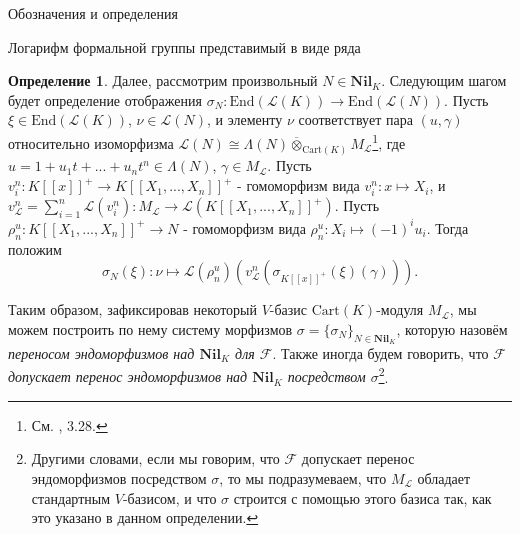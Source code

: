 \documentclass[a4paper,14pt]{extarticle}
\theoremstyle{definition}
\newtheorem{definition}{Определение}[section]
\newcommand{\Cart}{\mathrm{Cart}}
\newcommand{\End}[1]{\mathrm{End}\left(#1\right)}
\newcommand{\Nil}[1]{\mathbf{Nil}_{#1}}
\newcommand{\sF}{\mathscr{F}}
\newcommand{\sL}{\mathscr{L}}
\begin{document}
\begin{section}{Обозначения и определения}
\begin{subsection}{Логарифм формальной группы представимый в виде ряда}
\begin{definition}
    Далее, рассмотрим произвольный ${ N \in \Nil{K} }$. Следующим шагом будет определение отображения ${ \sigma_N : \End{\sL(K)} \rightarrow \End{\sL(N)} }$. Пусть ${ \xi \in \End{\sL(K)} }$, ${ \nu \in \sL(N) }$, и элементу $\nu$ соответствует пара ${ (u, \gamma) }$ относительно изоморфизма ${ \sL(N) \cong \Lambda(N) \overline{\otimes}_{\Cart(K)} M_\sL }$\footnote{
        См. \cite{Zink}, 3.28.
    }, где ${ u = 1 + u_1 t + ... + u_n t^n \in \Lambda(N) }$, ${ \gamma \in M_\sL }$. Пусть ${ v^n_i : K[[x]]^+ \rightarrow K[[X_1, ..., X_n]]^+ }$ - гомоморфизм вида ${ v^n_i : x \mapsto X_i }$, и ${ v^n_\sL = \sum\limits_{i = 1}^n \sL (v^n_i) : M_\sL \rightarrow \sL(K[[X_1, ..., X_n]]^+) }$. Пусть ${ \rho^u_n : K[[X_1, ..., X_n]]^+ \rightarrow N }$ - гомоморфизм вида ${ \rho^u_n : X_i \mapsto (-1)^i u_i }$. Тогда положим
    \begin{equation*}
        \sigma_N(\xi) :
        \nu \mapsto
        \sL(\rho^u_n) \left(
            v^n_\sL \left(
                \sigma_{K[[x]]^+}(\xi)(\gamma)
            \right)
        \right).
    \end{equation*}

    Таким образом, зафиксировав некоторый $V$-базис $\Cart(K)$-модуля $M_\sL$, мы можем построить по нему систему морфизмов ${ \sigma = \{ \sigma_N \}_{N \in \Nil{K}} }$, которую назовём \textit{переносом эндоморфизмов над $\Nil{K}$ для $\sF$}. Также иногда будем говорить, что \textit{$\sF$ допускает перенос эндоморфизмов над $\Nil{K}$ посредством $\sigma$}\footnote{
        Другими словами, если мы говорим, что $\sF$ допускает перенос эндоморфизмов посредством $\sigma$, то мы подразумеваем, что $M_\sL$ обладает стандартным $V$-базисом, и что $\sigma$ строится с помощью этого базиса так, как это указано в данном определении.
    }.
\end{definition}


\end{subsection}
\end{section}
\end{document}
